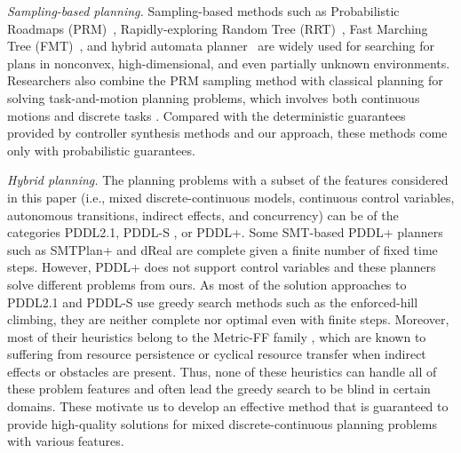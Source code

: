 \documentclass[sigconf]{acmart}
\begin{document}

\textit{Sampling-based planning.}
Sampling-based methods such as Probabilistic Roadmaps (PRM)~\cite{kavraki1994probabilistic}, Rapidly-exploring Random Tree (RRT)~\cite{kuffner2000rrt}, Fast Marching Tree (FMT)~\cite{janson2015fast}, and hybrid automata planner~\cite{lahijanian2014sampling} are widely used for searching for plans in nonconvex, high-dimensional, and even partially unknown environments. Researchers also combine the PRM sampling method with classical planning for solving task-and-motion planning problems, which involves both continuous motions and discrete tasks \cite{kaelbling2011hierarchical,lagriffoul2018platform,garrett2015ffrob,garrett2017sample,garrett2018ffrob}. Compared with the deterministic guarantees provided by controller synthesis methods and our approach, these methods come only with probabilistic guarantees.


\textit{Hybrid planning.}
The planning problems with a subset of the features considered in this paper (i.e., mixed discrete-continuous models, continuous control variables, autonomous transitions, indirect effects, and concurrency) can be of the categories PDDL2.1\cite{fox2003pddl2}, PDDL-S \cite{fernandez2018scottyactivity}, or  PDDL+\cite{fox2006modelling}. Some SMT-based PDDL+ planners such as SMTPlan+ \cite{cashmore2016compilation} and dReal \cite{bryce2015smt} are complete given a finite number of fixed time steps. However, PDDL+ does not support control variables and these planners solve different problems from ours. As most of the solution approaches to PDDL2.1 and PDDL-S  \cite{hoffmann2003metric,coles2012colin,fernandez2017mixed} use greedy search methods such as the enforced-hill climbing, they are neither complete nor optimal even with finite steps. Moreover, most of their heuristics belong to the Metric-FF family \cite{hoffmann2003metric}, which are known to suffering from resource persistence or cyclical resource transfer \cite{coles2013hybrid} when indirect effects or obstacles are present. Thus, none of these heuristics can handle all of these problem features and often lead the greedy search to be blind in certain domains. These motivate us to develop an effective method that is guaranteed to provide high-quality solutions for mixed discrete-continuous planning problems with various features. 
\end{document}
